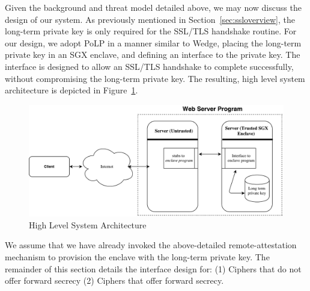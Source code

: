 \documentclass[../../main.tex]{subfiles}
\begin{document}
Given the background and threat model detailed above, we may now
discuss the design of our system. As previously mentioned in
Section~\ref{sec:ssloverview}, the long-term private key is only
required for the SSL/TLS handshake routine. For our design, we adopt
PoLP in a manner similar to Wedge, placing the long-term private key
in an SGX enclave, and defining an interface to the private key. The
interface is designed to allow an SSL/TLS handshake to complete
successfully, without compromising the long-term private key. The
resulting, high level system architecture is depicted in
Figure~\ref{fig:sysarch}.

\begin{figure}[H]
  \centering
  \includegraphics[scale=0.4]{images/high-level-arch.pdf}
  \caption{High Level System Architecture}
  \label{fig:sysarch}
\end{figure}

We assume that we have already invoked the above-detailed
remote-attestation mechanism to provision the enclave with the
long-term private key. The remainder of this section details the
interface design for: (1) Ciphers that do not offer forward secrecy
(2) Ciphers that offer forward secrecy.

\end{document}
